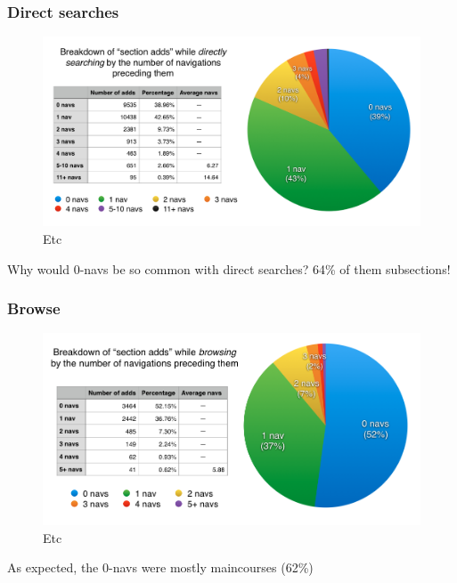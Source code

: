   \subsubsection{Direct searches}

  \begin{figure}
    \centering
    \includegraphics[width=1.0\textwidth]{images/graph/direct_navs}

    \caption{Etc}
    \label{fig:searchtypes}
  \end{figure}

  Why would 0-navs be so common with direct searches? 64\% of them subsections!

  \subsubsection{Browse}

  \begin{figure}
    \centering
    \includegraphics[width=1.0\textwidth]{images/graph/browse_navs}

    \caption{Etc}
    \label{fig:searchtypes}
  \end{figure}

  As expected, the 0-navs were mostly maincourses (62\%)

